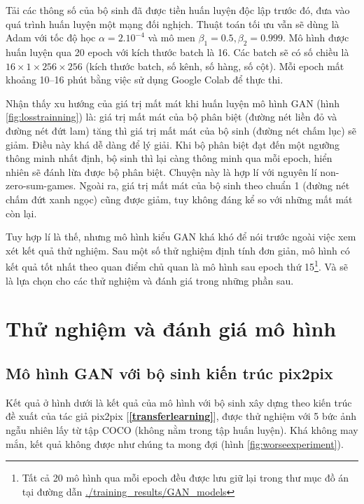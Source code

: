 \documentclass[a4paper, 12pt]{report}
\begin{document}
Tải các thông số của bộ sinh đã được tiền huấn luyện độc lập trước đó, đưa vào quá trình huấn luyện một mạng đối nghịch.
Thuật toán tối ưu vẫn sẽ dùng là Adam với tốc độ học $\alpha=2.10^{-4}$ và mô men $\beta_1 = 0.5, \beta_2=0.999$.
Mô hình được huấn luyện qua 20 epoch với kích thước batch là 16.
Các batch sẽ có số chiều là $16 \times 1 \times 256 \times 256$ (kích thước batch, số kênh, số hàng, số cột).
Mỗi epoch mất khoảng 10--16 phút bằng việc sử dụng Google Colab để thực thi.\vspace{5pt}

Nhận thấy xu hướng của giá trị mất mát khi huấn luyện mô hình GAN (hình \ref{fig:losstrainning}) là: giá trị mất mát của bộ phân biệt (đường nét liền đỏ và đường nét đứt lam) tăng thì giá trị mất mát của bộ sinh (đường nét chấm lục) sẽ giảm.
Điều này khá dễ dàng để lý giải.
Khi bộ phân biệt đạt đến một ngưỡng thông minh nhất định, bộ sinh thì lại càng thông minh qua mỗi epoch, hiển nhiên sẽ đánh lừa được bộ phân biệt.
Chuyện này là hợp lí với nguyên lí non-zero-sum-games.
Ngoài ra, giá trị mất mát của bộ sinh theo chuẩn 1 (đường nét chấm đứt xanh ngọc) cũng được giảm, tuy không đáng kể so với những mất mát còn lại.\vspace{5pt}

Tuy hợp lí là thế, nhưng mô hình kiểu GAN khá khó để nói trước ngoài việc xem xét kết quả thử nghiệm.
Sau một số thử nghiệm định tính đơn giản, mô hình có kết quả tốt nhất theo quan điểm chủ quan là mô hình sau epoch thứ 15\footnote{Tất cả 20 mô hình qua mỗi epoch đều được lưu giữ lại trong thư mục đồ án tại đường dẫn \href{https://github.com/dee-ex/EE3151\_SEM202\_PROJECT/tree/main/training_results/GAN_models}{./training\_results/GAN\_models}}.
Và sẽ là lựa chọn cho các thử nghiệm và đánh giá trong những phần sau.

\chapter{Thử nghiệm và đánh giá mô hình}\label{testmodel}

\section{Mô hình GAN với bộ sinh kiến trúc pix2pix}\label{badexperiment}

Kết quả ở hình dưới là kết quả của mô hình với bộ sinh xây dựng theo kiến trúc đề xuất của tác giả pix2pix [\textbf{\ref{transferlearning}}], được thử nghiệm với 5 bức ảnh ngẫu nhiên lấy từ tập COCO (không nằm trong tập huấn luyện).
Khá không may mắn, kết quả không được như chúng ta mong đợi (hình \ref{fig:worseexperiment}).
\end{document}
